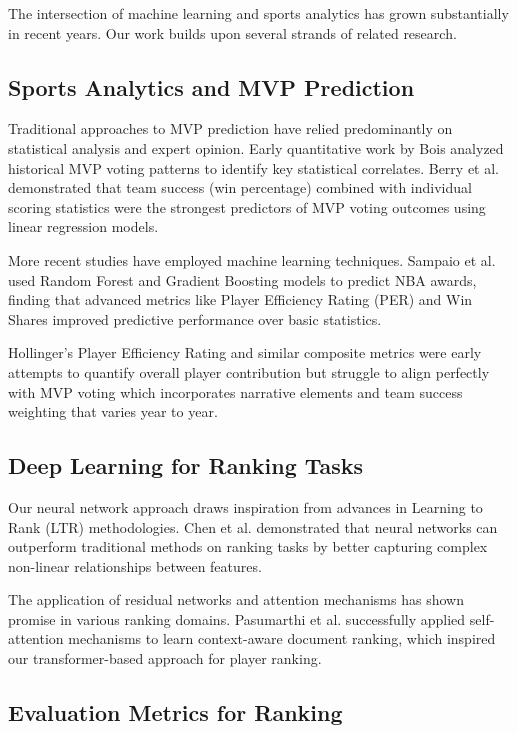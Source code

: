 \documentclass[10pt,twocolumn,letterpaper]{article}
\begin{document}
The intersection of machine learning and sports analytics has grown substantially in recent years. Our work builds upon several strands of related research.

\subsection{Sports Analytics and MVP Prediction}

Traditional approaches to MVP prediction have relied predominantly on statistical analysis and expert opinion. Early quantitative work by Bois \cite{bois2014} analyzed historical MVP voting patterns to identify key statistical correlates. Berry et al. \cite{berry2017} demonstrated that team success (win percentage) combined with individual scoring statistics were the strongest predictors of MVP voting outcomes using linear regression models.

More recent studies have employed machine learning techniques. Sampaio et al. \cite{sampaio2020} used Random Forest and Gradient Boosting models to predict NBA awards, finding that advanced metrics like Player Efficiency Rating (PER) and Win Shares improved predictive performance over basic statistics. 

Hollinger's Player Efficiency Rating \cite{hollinger2009} and similar composite metrics were early attempts to quantify overall player contribution but struggle to align perfectly with MVP voting which incorporates narrative elements and team success weighting that varies year to year.

\subsection{Deep Learning for Ranking Tasks}

Our neural network approach draws inspiration from advances in Learning to Rank (LTR) methodologies. Chen et al. \cite{chen2019} demonstrated that neural networks can outperform traditional methods on ranking tasks by better capturing complex non-linear relationships between features.

The application of residual networks \cite{he2016} and attention mechanisms \cite{vaswani2017} has shown promise in various ranking domains. Pasumarthi et al. \cite{pasumarthi2019} successfully applied self-attention mechanisms to learn context-aware document ranking, which inspired our transformer-based approach for player ranking.

\subsection{Evaluation Metrics for Ranking}
\end{document}
